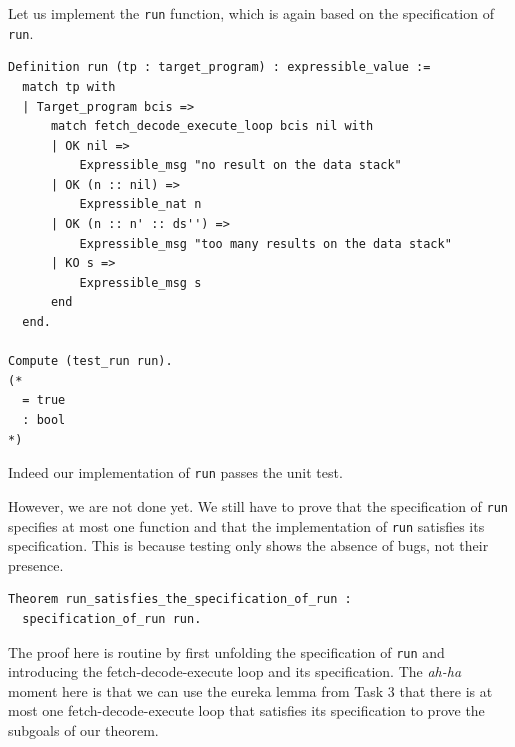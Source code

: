 \documentclass{article}
\begin{document}
Let us implement the \texttt{run} function, which is again based on the specification of \texttt{run}. 

\begin{lstlisting}
Definition run (tp : target_program) : expressible_value :=
  match tp with
  | Target_program bcis =>
      match fetch_decode_execute_loop bcis nil with
      | OK nil =>
          Expressible_msg "no result on the data stack"
      | OK (n :: nil) =>
          Expressible_nat n
      | OK (n :: n' :: ds'') =>
          Expressible_msg "too many results on the data stack"
      | KO s =>
          Expressible_msg s
      end
  end.

Compute (test_run run).
(*
  = true
  : bool
*)
\end{lstlisting}

Indeed our implementation of \texttt{run} passes the unit test.

However, we are not done yet. We still have to prove that the specification of \texttt{run} specifies at most one function and that the implementation of \texttt{run} satisfies its specification. This is because testing only shows the absence of bugs, not their presence.

\begin{lstlisting}
Theorem run_satisfies_the_specification_of_run :
  specification_of_run run.
\end{lstlisting}

The proof here is routine by first unfolding the specification of \texttt{run} and introducing the fetch-decode-execute loop and its specification. The \emph{ah-ha} moment here is that we can use the eureka lemma from Task 3 that there is at most one fetch-decode-execute loop that satisfies its specification to prove the subgoals of our theorem. 
\end{document}
